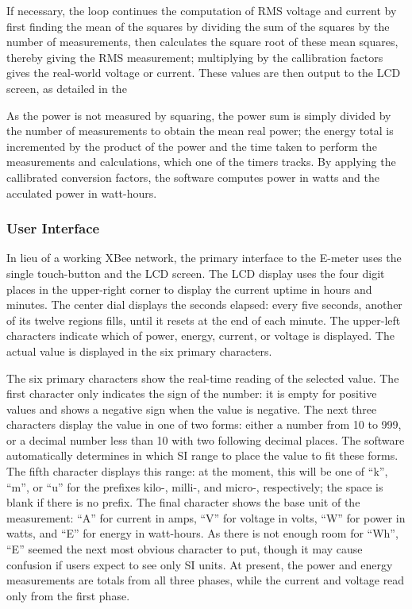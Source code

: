 If necessary, the loop continues the computation of \ac{RMS} voltage
and current by first finding the mean of the squares by dividing the
sum of the squares by the number of measurements, then calculates the
square root of these mean squares, thereby giving the RMS measurement;
multiplying by the callibration factors gives the real-world voltage
or current. These values are then output to the LCD screen, as
detailed in the 

As the power is not measured by squaring, the power sum is simply
divided by the number of measurements to obtain the mean real power;
the energy total is incremented by the product of the power and the
time taken to perform the measurements and calculations, which one of
the timers tracks. By applying the callibrated conversion factors,
the software computes power in watts and the acculated power in
watt-hours. 

\subsubsection{User Interface}
In lieu of a working XBee network, the primary interface to the
E-meter uses the single touch-button and the \ac{LCD} screen. The LCD
display uses the four digit places in the upper-right corner to
display the current uptime in hours and minutes. The center dial
displays the seconds elapsed: every five seconds, another of its
twelve regions fills, until it resets at the end of each minute. The
upper-left characters indicate which of power, energy, current, or
voltage is displayed. The actual value is displayed in the six primary
characters.

The six primary characters show the real-time reading of the selected
value. The first character only indicates the sign of the number: it
is empty for positive values and shows a negative sign when the value
is negative. The next three characters display the value in one of two
forms: either a number from 10 to 999, or a decimal number less than
10 with two following decimal places. The software automatically
determines in which \ac{SI} range to place the value to fit these
forms. The fifth character displays this range: at the moment, this
will be one of ``k'', ``m'', or ``u'' for the prefixes kilo-, milli-,
and micro-, respectively; the space is blank if there is no
prefix. The final character shows the base unit of the measurement:
``A'' for current in amps, ``V'' for voltage in volts, ``W'' for power
in watts, and ``E'' for energy in watt-hours. As there is not enough
room for ``Wh'', ``E'' seemed the next most obvious character to put,
though it may cause confusion if users expect to see only \ac{SI}
units. At present, the power and energy measurements are totals from
all three phases, while the current and voltage read only from the
first phase.

